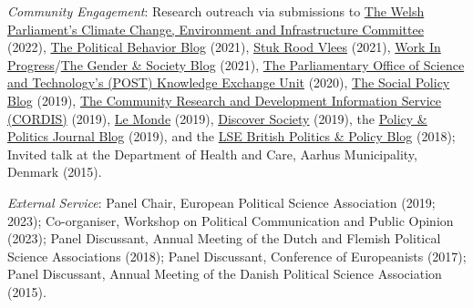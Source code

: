 \documentclass[letterpaper,fontsize=10.5pt]{scrartcl}
\begin{document}
{}\textit{Community Engagement}: Research outreach via submissions to \href{https://senedd.wales/seneddclimate}{The Welsh Parliament's Climate Change, Environment and Infrastructure Committee} (2022), \href{https://tinyurl.com/4t6k26nh}{The Political Behavior Blog} (2021), \href{https://stukroodvlees.nl/meer-inspraak-minder-schuld/}{Stuk Rood Vlees} (2021), \href{http://www.wipsociology.org/2021/09/16/womens-work-and-the-welfare-state-new-analysis-quantifies-how-gender-class-and-social-policy-shape-unpaid-care-work/}{Work In Progress}/\href{https://gendersociety.wordpress.com/2021/09/03/womens-work-and-the-welfare-state-new-analysis-quantifies-how-gender-class-and-social-policy-shape-unpaid-care-work/}{The Gender \& Society Blog} (2021),  \href{https://www.lboro.ac.uk/media-centre/press-releases/2020/october/life-beyond-covid-19-loughborough-experts/}{The Parliamentary Office of Science and Technology's (POST) Knowledge Exchange Unit} (2020), \href{https://socialpolicyblog.com/2019/05/08/explaining-other-peoples-stances-on-inequality/}{The Social Policy Blog} (2019), \href{https://cordis.europa.eu/project/rcn/209009/brief/en}{The Community Research and Development Information Service (CORDIS)} (2019), \href{https://www.lemonde.fr/idees/article/2019/03/22/nous-demandons-des-programmes-sociaux-moins-genereux-lorsque-nos-revenus-diminuent_5439877_3232.html}{Le Monde} (2019), \href{https://archive.discoversociety.org/2019/02/06/policy-and-politics-one-of-us-how-welfare-states-help-shape-immigrant-integration/}{Discover Society} (2019), the \href{https://policyandpoliticsblog.com/2019/02/20/one-of-us-how-welfare-states-help-shape-immigrant-integration/}{Policy \& Politics Journal Blog} (2019), and the \href{http://blogs.lse.ac.uk/politicsandpolicy/how-claims-about-welfare-benefit-levels-affect-public-opinion/}{LSE British Politics \& Policy Blog} (2018); Invited talk at the Department of Health and Care, Aarhus Municipality, Denmark (2015).\\ 
\hfill \break
{}
{}\textit{External Service}: Panel Chair, European Political Science Association (2019; 2023); Co-organiser, Workshop on Political Communication and Public Opinion (2023); Panel Discussant, Annual Meeting of the Dutch and Flemish Political Science Associations (2018); Panel Discussant, Conference of Europeanists (2017); Panel Discussant, Annual Meeting of the Danish Political Science Association (2015).\\ 
\hfill \break
\end{document}
